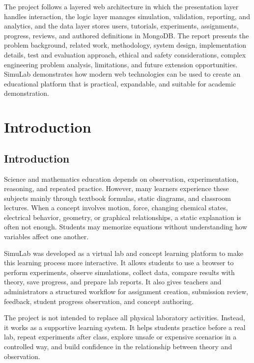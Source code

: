 \documentclass[12pt,a4paper]{report}
\begin{document}
The project follows a layered web architecture in which the presentation layer handles interaction, the logic layer manages simulation, validation, reporting, and analytics, and the data layer stores users, tutorials, experiments, assignments, progress, reviews, and authored definitions in MongoDB. The report presents the problem background, related work, methodology, system design, implementation details, test and evaluation approach, ethical and safety considerations, complex engineering problem analysis, limitations, and future extension opportunities. SimuLab demonstrates how modern web technologies can be used to create an educational platform that is practical, expandable, and suitable for academic demonstration.

\tableofcontents
\listoftables
\listoffigures

\clearpage
{}

\chapter{Introduction}

\section{Introduction}
Science and mathematics education depends on observation, experimentation, reasoning, and repeated practice. However, many learners experience these subjects mainly through textbook formulas, static diagrams, and classroom lectures. When a concept involves motion, force, changing chemical states, electrical behavior, geometry, or graphical relationships, a static explanation is often not enough. Students may memorize equations without understanding how variables affect one another.

SimuLab was developed as a virtual lab and concept learning platform to make this learning process more interactive. It allows students to use a browser to perform experiments, observe simulations, collect data, compare results with theory, save progress, and prepare lab reports. It also gives teachers and administrators a structured workflow for assignment creation, submission review, feedback, student progress observation, and concept authoring.

The project is not intended to replace all physical laboratory activities. Instead, it works as a supportive learning system. It helps students practice before a real lab, repeat experiments after class, explore unsafe or expensive scenarios in a controlled way, and build confidence in the relationship between theory and observation.
\end{document}
